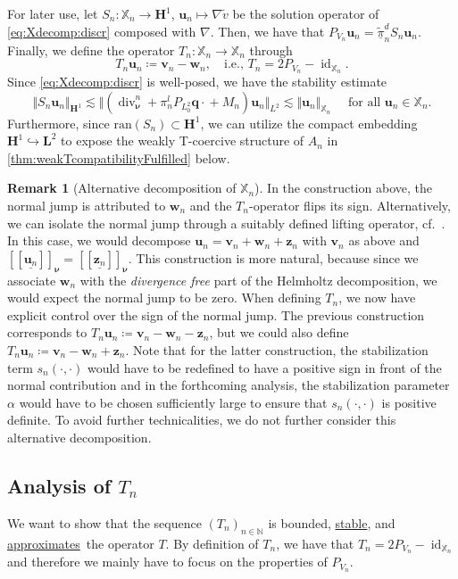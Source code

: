 \documentclass{m2an}
\newcommand{\nv}{\boldsymbol{\nu}}
\renewcommand{\u}{\mathbf{u}}
\renewcommand{\v}{\mathbf{v}}
\newcommand{\w}{\mathbf{w}}
\newcommand{\z}{\mathbf{z}}
\newcommand{\q}{\mathbf{q}} %
\renewcommand{\div}{\operatorname{div}}
\DeclareMathOperator{\Id}{\mathrm{id}}%
\newcommand{\Xn}{\mathbb{X}_n}
\newcommand{\bH}{{\mathbf H}}
\newcommand{\bL}{\mathbf{L}}
\newcommand{\hdgjump}[1]{[\![\underline{#1} ]\!]}
\newcommand{\seq}[1]{(#1_n)_{n \in \mathbb{N}}}
\newcommand{\ddiv}{\div_{\nv}^n}
\newcommand{\ddivpqMn}{(\ddiv + \pi_n^l P_{L^2_0} \q \cdot \! + M_n)}
\newcommand{\pinXd}{\underline{\tilde{\pi}}_n^d}
\newcommand{\Sol}{S_n}
\newcommand\stable{\hyperlink{stable}{stable}}
\newcommand\approximates{\hyperlink{approximate}{approximates}}
\theoremstyle{plain}
\theoremstyle{definition}
\newtheorem{remark}[theorem]{Remark}
\begin{document}
For later use, let $\Sol : \Xn \to \bH^1$, $\u_n \mapsto \nabla \tilde{v}$ be the solution operator of \eqref{eq:Xdecomp:discr} composed with $\nabla$. Then, we have that $P_{V_n} \u_n = \pinXd \Sol \u_n$.
Finally, we define the operator $T_n \colon \Xn \to \Xn$ through 
\begin{equation}\label{eq:def:Tn}
   T_n \u_n \coloneqq \v_n - \w_n,
   \quad \text{i.e., } T_n = 2P_{V_n} - \Id_{\Xn}.
\end{equation} 
Since \eqref{eq:Xdecomp:discr} is well-posed, we have the stability estimate 
\begin{equation}\label{eq:tildevStability}
   \Vert \Sol \u_n \Vert_{\bH^1} \lesssim \Vert \ddivpqMn \u_n \Vert_{L^2} \lesssim \Vert \u_n \Vert_{\Xn} \quad \text{ for all } \u_n \in \Xn.
\end{equation}
Furthermore, since $\text{ran}(\Sol) \subset \bH^1$, we can utilize the compact embedding $\bH^1 \hookrightarrow \bL^2$ to expose the weakly T-coercive structure of $A_n$ in \cref{thm:weakTcompatibilityFulfilled} below.

\begin{remark}[Alternative decomposition of $\Xn$]
   In the construction above, the normal jump is attributed to $\w_n$ and the $T_n$-operator flips its sign. Alternatively, we can isolate the normal jump through a suitably defined lifting operator, cf.~\cite{AHLS22,Thesis_vB23}. In this case, we would decompose $\u_n = \v_n + \w_n + \z_n$ with $\v_n$ as above and $\hdgjump{\u_n}_{\nv} = \hdgjump{\z_n}_{\nv}$. This construction is more natural, because since we associate $\w_n$ with the \emph{divergence free} part of the Helmholtz decomposition, we would expect the normal jump to be zero.  
   When defining $T_n$, we now have explicit control over the sign of the normal jump. The previous construction corresponds to $T_n \u_n \coloneqq \v_n - \w_n - \z_n$, but we could also define $T_n \u_n \coloneqq \v_n - \w_n + \z_n$. Note that for the latter construction, the stabilization term $s_n(\cdot,\cdot)$ would have to be redefined to have a positive sign in front of the normal contribution and in the forthcoming analysis, the stabilization parameter $\alpha$ would have to be chosen sufficiently large to ensure that $s_n(\cdot,\cdot)$ is positive definite. To avoid further technicalities, we do not further consider this alternative decomposition. 
\end{remark}

\subsection{Analysis of $T_n$}\label{subsec:CA:TnAnalysis}
We want to show that the sequence $\seq{T}$ is bounded, \stable, and \approximates~the operator $T$. By definition of $T_n$, we have that $T_n = 2P_{V_n} - \Id_{\Xn}$ and therefore we mainly have to focus on the properties of $P_{V_n}$.
\end{document}
